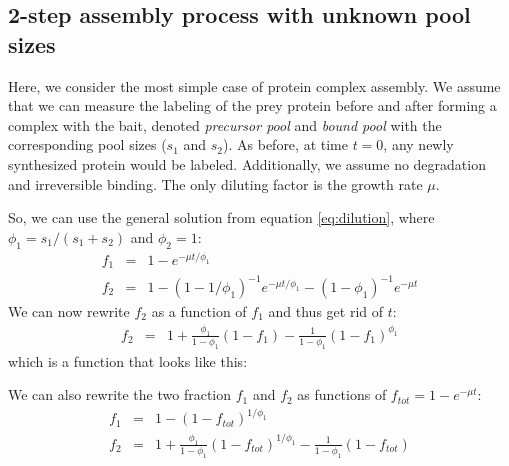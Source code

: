 \documentclass{article}
\begin{document}
\subsection{2-step assembly process with unknown pool sizes}
Here, we consider the most simple case of protein complex assembly. We assume that we can measure the labeling of the prey protein before and after forming a complex with the bait, denoted \textit{precursor pool} and \textit{bound pool} with the corresponding pool sizes ($s_1$ and $s_2$). As before, at time $t = 0$, any newly synthesized protein would be labeled. Additionally, we assume no degradation and irreversible binding. The only diluting factor is the growth rate $\mu$.

So, we can use the general solution from equation \ref{eq:dilution}, where $\phi_1 = s_1 / (s_1 + s_2)$ and $\phi_2 = 1$:
\begin{eqnarray}
    f_1 &=& 1 - e^{- \mu t / \phi_1} \\
    f_2 &=& 1 - \left(1 - 1 / \phi_1 \right)^{-1} e^{- \mu t / \phi_1} - \left(1 - \phi_1 \right)^{-1} e^{- \mu t}
\end{eqnarray}
We can now rewrite $f_2$ as a function of $f_1$ and thus get rid of $t$:
\begin{eqnarray}
    f_2 &=& 1 + \frac{\phi_1}{1-\phi_1} (1 - f_1) - \frac{1}{1-\phi_1} (1 - f_1)^{\phi_1}
\end{eqnarray}
which is a function that looks like this:
\begin{center}
\end{center}

We can also rewrite the two fraction $f_1$ and $f_2$ as functions of $f_{tot} = 1 - e^{- \mu t}$:
\begin{eqnarray}
    f_1 &=& 1 - (1 - f_{tot})^{1/{\phi_1}} \label{eq:two_step_f1_vs_ftot} \nonumber\\
    f_2 &=& 1 + \frac{\phi_1}{1-\phi_1} (1 - f_{tot})^{1/{\phi_1}} - \frac{1}{1-\phi_1} (1 - f_{tot}) \label{eq:two_step_f2_vs_ftot}
\end{eqnarray}
\end{document}
